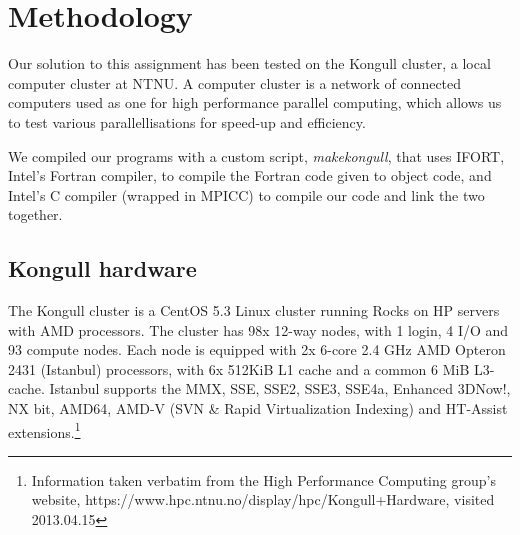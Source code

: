 \section{Methodology}
Our solution to this assignment has been tested on the Kongull cluster, a local computer cluster at NTNU. A computer cluster is a network of connected computers used as one for high performance parallel computing, which allows us to test various parallellisations for speed-up and efficiency.

We compiled our programs with a custom script, \emph{makekongull}, that uses IFORT, Intel's Fortran compiler, to compile the Fortran code given to object code, and Intel's C compiler (wrapped in MPICC) to compile our code and link the two together.

\subsection{Kongull hardware}
The Kongull cluster is a CentOS 5.3 Linux cluster running Rocks on HP servers with AMD processors. The cluster has 98x 12-way nodes, with 1 login, 4 I/O and 93 compute nodes. Each node is equipped with 2x 6-core 2.4 GHz AMD Opteron 2431 (Istanbul) processors, with 6x 512KiB L1 cache and a common 6 MiB L3-cache. Istanbul supports the MMX, SSE, SSE2, SSE3, SSE4a, Enhanced 3DNow!, NX bit, AMD64, AMD-V (SVN \& Rapid Virtualization Indexing) and HT-Assist extensions.\footnote{Information taken verbatim from the High Performance Computing group's website, https://www.hpc.ntnu.no/display/hpc/Kongull+Hardware, visited 2013.04.15}